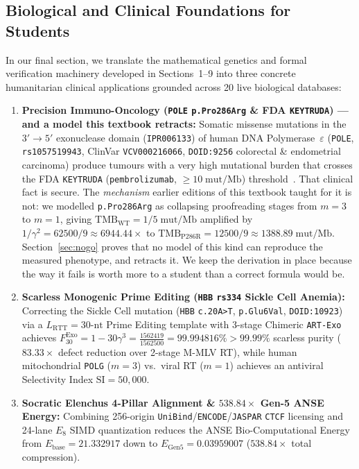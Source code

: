 \documentclass[11pt,a4paper]{article}
\theoremstyle{definition}
\theoremstyle{remark}
\begin{document}
\subsection{Biological and Clinical Foundations for Students}
In our final section, we translate the mathematical genetics and formal verification machinery developed in Sections~1--9 into three concrete humanitarian clinical applications grounded across 20 live biological databases:
\begin{enumerate}
  \item \textbf{Precision Immuno-Oncology (\texttt{POLE} \texttt{p.Pro286Arg} \& FDA \texttt{KEYTRUDA}) --- and a model this textbook retracts:} Somatic missense mutations in the $3'\to 5'$ exonuclease domain (\texttt{IPR006133}) of human DNA Polymerase~$\varepsilon$ (\texttt{POLE}, \texttt{rs1057519943}, ClinVar \texttt{VCV000216066}, \texttt{DOID:9256} colorectal \& endometrial carcinoma) produce tumours with a very high mutational burden that crosses the FDA \texttt{KEYTRUDA} (\texttt{pembrolizumab}, $\ge 10\;\mathrm{mut/Mb}$) threshold~\cite{rayner2016pole}. That clinical fact is secure. The \emph{mechanism} earlier editions of this textbook taught for it is not: we modelled \texttt{p.Pro286Arg} as collapsing proofreading stages from $m=3$ to $m=1$, giving $\mathrm{TMB}_{\mathrm{WT}} = 1/5\;\mathrm{mut/Mb}$ amplified by $1/\gamma^2 = 62500/9 \approx 6944.44\times$ to $\mathrm{TMB}_{\mathrm{P286R}} = 12500/9 \approx 1388.89\;\mathrm{mut/Mb}$. Section~\ref{sec:nogo} proves that no model of this kind can reproduce the measured phenotype, and retracts it. We keep the derivation in place because the way it fails is worth more to a student than a correct formula would be.
  \item \textbf{Scarless Monogenic Prime Editing (\texttt{HBB} \texttt{rs334} Sickle Cell Anemia):} Correcting the Sickle Cell mutation (\texttt{HBB} \texttt{c.20A>T}, \texttt{p.Glu6Val}, \texttt{DOID:10923}) via a $L_{\mathrm{RTT}} = 30\text{-nt}$ Prime Editing template with 3-stage Chimeric \texttt{ART-Exo} achieves $F_{30}^{\mathrm{Exo}} = 1 - 30\gamma^3 = \frac{1562419}{1562500} = 99.994816\% > 99.99\%$ scarless purity ($83.33\times$ defect reduction over 2-stage M-MLV RT), while human mitochondrial \texttt{POLG} ($m=3$) vs.\ viral RT ($m=1$) achieves an antiviral Selectivity Index $\mathrm{SI} = 50{,}000$.
  \item \textbf{Socratic Elenchus 4-Pillar Alignment \& $538.84\times$ Gen-5 ANSE Energy:} Combining 256-origin \texttt{UniBind}/\texttt{ENCODE}/\texttt{JASPAR} \texttt{CTCF} licensing and 24-lane $E_8$ SIMD quantization reduces the ANSE Bio-Computational Energy from $E_{\mathrm{base}} = 21.332917$ down to $E_{\mathrm{Gen5}} = 0.03959007$ ($538.84\times$ total compression).
\end{enumerate}
\end{document}

